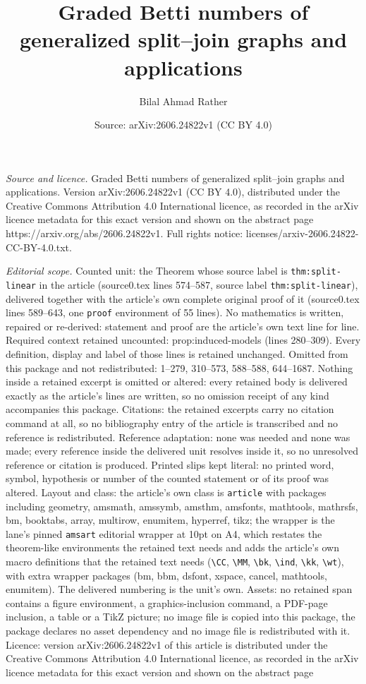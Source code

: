 \documentclass[10pt,a4paper]{amsart}
\title[Graded Betti numbers of generalized split--join graphs and a]{Graded Betti numbers of generalized split--join graphs and applications}
\author{Bilal Ahmad Rather}
\date{Source: arXiv:2606.24822v1 (CC BY 4.0)}
\begin{document}
\maketitle

\noindent\emph{Source and licence.} Graded Betti numbers of generalized split--join graphs and applications. Version arXiv:2606.24822v1 (CC BY 4.0), distributed under the Creative Commons Attribution 4.0 International licence, as recorded in the arXiv licence metadata for this exact version and shown on the abstract page https://arxiv.org/abs/2606.24822v1. Full rights notice: licenses/arxiv-2606.24822-CC-BY-4.0.txt.\par\smallskip

\noindent\textit{Editorial scope.} Counted unit: the Theorem whose source label is \texttt{thm:split-linear} in the article (source0.tex lines 574--587, source label \texttt{thm:split-linear}), delivered together with the article's own complete original proof of it (source0.tex lines 589--643, one \texttt{proof} environment of 55 lines). No mathematics is written, repaired or re-derived: statement and proof are the article's own text line for line. Required context retained uncounted: prop:induced-models (lines 280--309). Every definition, display and label of those lines is retained unchanged. Omitted from this package and not redistributed: 1--279, 310--573, 588--588, 644--1687. Nothing inside a retained excerpt is omitted or altered: every retained body is delivered exactly as the article's lines are written, so no omission receipt of any kind accompanies this package. Citations: the retained excerpts carry no citation command at all, so no bibliography entry of the article is transcribed and no reference is redistributed. Reference adaptation: none was needed and none was made; every reference inside the delivered unit resolves inside it, so no unresolved reference or citation is produced. Printed slips kept literal: no printed word, symbol, hypothesis or number of the counted statement or of its proof was altered. Layout and class: the article's own class is \texttt{article} with packages including geometry, amsmath, amssymb, amsthm, amsfonts, mathtools, mathrsfs, bm, booktabs, array, multirow, enumitem, hyperref, tikz; the wrapper is the lane's pinned \texttt{amsart} editorial wrapper at 10pt on A4, which restates the theorem-like environments the retained text needs and adds the article's own macro definitions that the retained text needs (\texttt{\textbackslash CC}, \texttt{\textbackslash MM}, \texttt{\textbackslash bk}, \texttt{\textbackslash ind}, \texttt{\textbackslash kk}, \texttt{\textbackslash wt}), with extra wrapper packages (bm, bbm, dsfont, xspace, cancel, mathtools, enumitem). The delivered numbering is the unit's own. Assets: no retained span contains a figure environment, a graphics-inclusion command, a PDF-page inclusion, a table or a TikZ picture; no image file is copied into this package, the package declares no asset dependency and no image file is redistributed with it. Licence: version arXiv:2606.24822v1 of this article is distributed under the Creative Commons Attribution 4.0 International licence, as recorded in the arXiv licence metadata for this exact version and shown on the abstract page 
\end{document}
